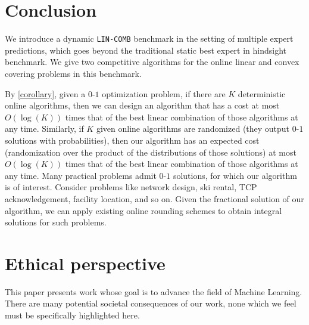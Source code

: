 
\section{Conclusion} \label{sec:conclusion}

We introduce a dynamic \texttt{LIN-COMB} benchmark in the setting of multiple expert predictions, which goes beyond the traditional static best expert in hindsight benchmark. We give two competitive algorithms for the online linear and convex covering problems in this benchmark.

By \cref{corollary}, given a $0$-$1$ optimization problem, if there are $K$ deterministic online algorithms, then
we can design an algorithm that has a cost at most $O(\log (K))$ times that of the best linear combination of those algorithms at any time.
Similarly, if $K$ given online algorithms are randomized (they output $0$-$1$ solutions with probabilities), then our algorithm
has an expected cost (randomization over the product of the distributions of those solutions) at most $O(\log(K))$ times that of
the best linear combination of those algorithms at any time. Many practical problems admit $0$-$1$ solutions, for which our algorithm is of interest.
Consider problems like network design, ski rental, TCP acknowledgement, facility location, and so on. Given the fractional solution of our algorithm,
we can apply existing online rounding schemes to obtain integral solutions for such problems.


\section{Ethical perspective}

This paper presents work whose goal is to advance the field of Machine Learning. There are many potential societal consequences of our work, none which we feel must be specifically highlighted here.
